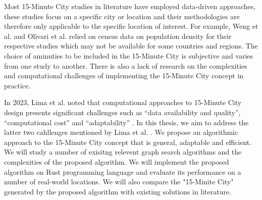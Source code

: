 Most 15-Minute City studies in literature have employed data-driven approaches, these studies focus on a specific city or location and their methodologies are therefore only applicable to the specific location of interest. For example, Weng et al. \cite{weng_15-minute_2019} and Olivari et al.\cite{olivari_are_2023} relied on census data on population density for their respective studies which may not be available for some countries and regions. The choice of aminuties to be included in the 15-Minute City is subjective and varies from one study to another. There is also a lack of research on the complexities and computational challenges of implementing the 15-Minute City concept in practice.

In 2023, Lima et al. noted that computational approaches to 15-Minute City design presents significant challenges such as “data availability and quality”, “computational cost” and “adaptability” \cite{lima_quest_2023}. In this thesis, we aim to address the latter two cahllenges mentioned by Lima et al. \cite{lima_quest_2023}. We propose an algorithmic approach to the 15-Minute City concept that is general, adaptable and efficient. We will study a number of exisitng relevent graph search algorithms and the complexities of the proposed algorithm. We will implement the proposed algorithm on Rust programming language and evaluate its performance on a number of real-world locations. We will also compare the "15-Minite City" generated by the proposed algorithm with existing solutions in literature.